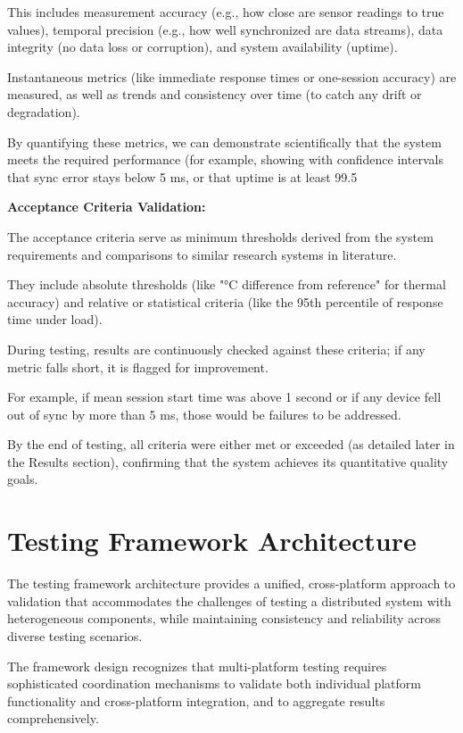 {{{This includes measurement accuracy (e.g., how close are sensor readings to true values), temporal precision (e.g., how well synchronized are data streams), data integrity (no data loss or corruption), and system availability (uptime).

Instantaneous metrics (like immediate response times or one-session accuracy) are measured, as well as trends and consistency over time (to catch any drift or degradation).

By quantifying these metrics, we can demonstrate scientifically that the system meets the required performance (for example, showing with confidence intervals that sync error stays below 5 ms, or that uptime is at least 99.5%

\textbf{Acceptance Criteria Validation:}

The acceptance criteria serve as minimum thresholds derived from the system requirements and comparisons to similar research systems in literature.

They include absolute thresholds (like "°C difference from reference" for thermal accuracy) and relative or statistical criteria (like the 95th percentile of response time under load).

During testing, results are continuously checked against these criteria; if any metric falls short, it is flagged for improvement.

For example, if mean session start time was above 1 second or if any device fell out of sync by more than 5 ms, those would be failures to be addressed.

By the end of testing, all criteria were either met or exceeded (as detailed later in the Results section), confirming that the system achieves its quantitative quality goals.

\section{Testing Framework Architecture}

The testing framework architecture provides a unified, cross-platform approach to validation that accommodates the challenges of testing a distributed system with heterogeneous components, while maintaining consistency and reliability across diverse testing scenarios.

The framework design recognizes that multi-platform testing requires sophisticated coordination mechanisms to validate both individual platform functionality and cross-platform integration, and to aggregate results comprehensively.

}}}

